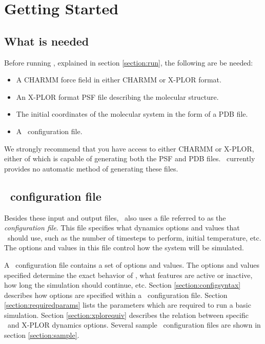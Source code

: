
\section{Getting Started}
\label{section:start}

\subsection{What is needed}

Before running \NAMD, explained in section \ref{section:run}, 
the following are be needed:
\begin{itemize}
\item A CHARMM force field in either CHARMM or X-PLOR format.
\item
An X-PLOR format PSF file describing the molecular structure.
\item
The initial coordinates of the molecular system in the form of a PDB file.  
\item
A \NAMD\ configuration file.
\end{itemize}

We strongly recommend that you have access to either CHARMM or X-PLOR,
either of which is capable of generating both the PSF and PDB files.
\NAMD\ currently provides no automatic method of generating these files.

\subsection{\NAMD\ configuration file}
\label{section:config}

Besides these input and output files, \NAMD\ also uses 
a file referred to as the {\it configuration file\/}.  
This file specifies what dynamics options and values that 
\NAMD\ should use, such as the number of timesteps to perform, 
initial temperature, etc.  
The options and values in this file control how 
the system will be simulated.  

A \NAMD\ configuration file contains a set of options and values.  
The options and values specified determine the exact behavior of
\NAMD, what features are active or inactive, how long the simulation
should continue, etc.  Section \ref{section:configsyntax} describes how
options are specified within a \NAMD\ configuration file.  Section
\ref{section:requiredparams} lists the parameters which are required
to run a basic simulation.  Section \ref{section:xplorequiv}
describes the relation between specific \NAMD\ and X-PLOR dynamics
options.  Several sample \NAMD\ configuration files are shown
in section \ref{section:sample}.


